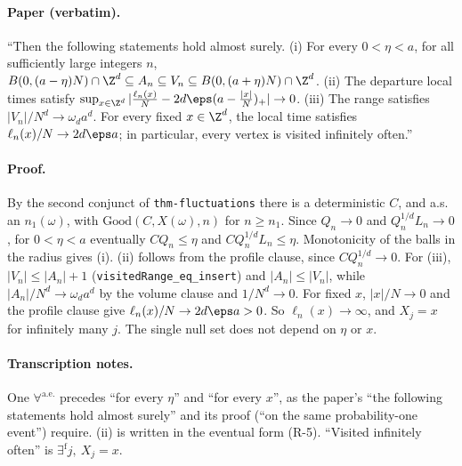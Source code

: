 \paragraph{Paper (verbatim).} ``Then the following statements hold almost surely. (i) For every
$0<\eta<a$, for all sufficiently large integers $n$,
$B(0,(a-\eta)N)\cap\Z^d\subseteq A_n\subseteq V_n\subseteq B(0,(a+\eta)N)\cap\Z^d$. (ii) The departure
local times satisfy $\sup_{x\in\Z^d}|\frac{\ell_n(x)}N-2d\eps(a-\frac{|x|}N)_+|\to0$. (iii) The range
satisfies $|V_n|/N^d\to\omega_da^d$. For every fixed $x\in\Z^d$, the local time satisfies
$\ell_n(x)/N\to2d\eps a$; in particular, every vertex is visited infinitely often.''
\paragraph{Proof.} By the second conjunct of \texttt{thm-fluctuations} there is a deterministic
$C$, and a.s. an $n_1(\omega)$, with $\mathrm{Good}(C,X(\omega),n)$ for $n\ge n_1$. Since
$Q_n\to0$ and $Q_n^{1/d}L_n\to0$, for $0<\eta<a$ eventually $CQ_n\le\eta$ and $CQ_n^{1/d}L_n\le\eta$.
Monotonicity of the balls in the radius gives (i). (ii) follows from the profile clause, since
$CQ_n^{1/d}\to0$. For (iii), $|V_n|\le|A_n|+1$ (\texttt{visitedRange\_eq\_insert}) and
$|A_n|\le|V_n|$, while $|A_n|/N^d\to\omega_da^d$ by the volume clause and $1/N^d\to0$. For fixed $x$,
$|x|/N\to0$ and the profile clause give $\ell_n(x)/N\to2d\eps a>0$. So $\ell_n(x)\to\infty$, and
$X_j=x$ for infinitely many $j$. The single null set does not depend on $\eta$ or $x$.
\paragraph{Transcription notes.} One $\forall^\mathrm{a.e.}$ precedes ``for every $\eta$'' and ``for
every $x$'', as the paper's ``the following statements hold almost surely'' and its proof
(``on the same probability-one event'') require. (ii) is written in the eventual form (R-5).
``Visited infinitely often'' is $\exists^\mathrm{f}j,\ X_j=x$.
